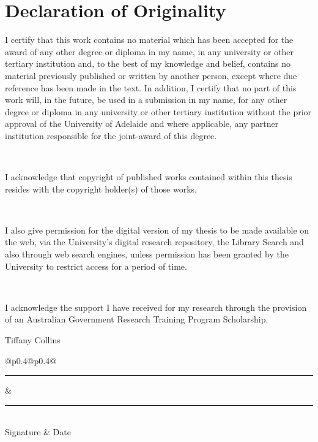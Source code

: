 \chapter{Declaration of Originality}

I certify that this work contains no material which has been accepted for the award of any other degree or diploma in my name, in any university or other tertiary institution and, to the best of my knowledge and belief, contains no material previously published or written by another person, except where due reference has been made in the text. In addition, I certify that no part of this work will, in the future, be used in a submission in my name, for any other degree or diploma in any university or other tertiary institution without the prior approval of the University of Adelaide and where applicable, any partner institution responsible for the joint-award of this degree.

~

I acknowledge that copyright of published works contained within this thesis resides with the copyright holder(s) of those works.

~

I also give permission for the digital version of my thesis to be made available on the web, via the University’s digital research
repository, the Library Search and also through web search engines, unless permission has been granted by the University to restrict access for a period of time.

~

I acknowledge the support I have received for my research through the provision of an Australian Government Research Training
Program Scholarship.

\vspace{4.0cm}

Tiffany Collins

\vspace{4.0cm}

\begin{tabular}{@{}p{0.4\textwidth}@{\hspace{0.15\textwidth}}p{0.4\textwidth}@{}}
	\rule{\linewidth}{0.25pt} & \rule{\linewidth}{0.25pt} \\
	Signature & Date
\end{tabular}